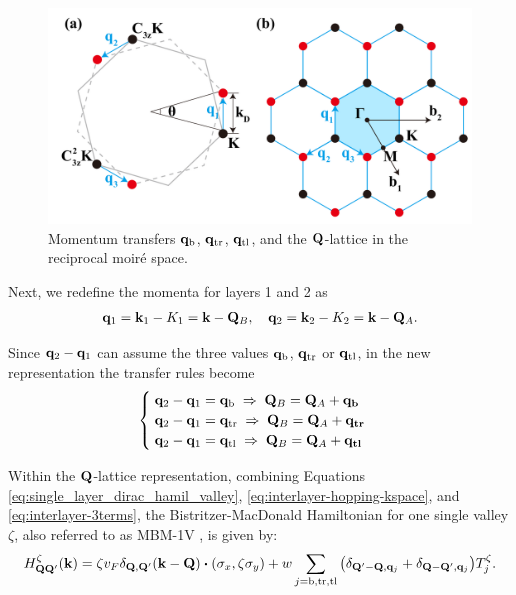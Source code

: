 \begin{figure}[H]
\centering
\includegraphics[width=0.8\linewidth]{fig/moire-vectors.png}
\caption{Momentum transfers \( {\vb{q}}_{\text{b}} \), \( {\vb{q}}_{\text{tr}} \), \( {\vb{q}}_{\text{tl}} \), and the \( {\vb{Q}} \)-lattice in the reciprocal moiré space.}
\label{fig:Q_lattice}
\end{figure}

Next, we redefine the momenta for layers 1 and 2 as
\begin{equation} \label{eq:redef_k1k2_momenta_Qlattice}
{\vb{q}}_1 = {\vb{k}}_1 - K_1 = {\vb{k}} - {\vb{Q}}_B, \quad {\vb{q}}_2 = {\vb{k}}_2 - K_2 = {\vb{k}} - {\vb{Q}}_A.
\end{equation}

Since ${\vb{q}}_2 - {\vb{q}}_1$ can assume the three values ${\vb{q}}_{\text{b}}$, ${\vb{q}}_{\text{tr}}$ or ${\vb{q}}_{\text{tl}}$, in the new representation the transfer rules become
\begin{align} \label{eq:selection_rules_qbqtrqtl_QAQB}
\begin{cases}
\; {\vb{q}}_2-{\vb{q}}_1={\vb{q}}_{\text{b}}  \; \Rightarrow \; {\vb{Q}}_B = {\vb{Q}}_A + {\vb{q}}_{\textbf{b}} \\
\; {\vb{q}}_2-{\vb{q}}_1={\vb{q}}_{\text{tr}} \; \Rightarrow \; {\vb{Q}}_B = {\vb{Q}}_A + {\vb{q}}_{\textbf{tr}} \\
\; {\vb{q}}_2-{\vb{q}}_1={\vb{q}}_{\text{tl}} \; \Rightarrow \; {\vb{Q}}_B = {\vb{Q}}_A + {\vb{q}}_{\textbf{tl}}
\end{cases}
\end{align}

Within the ${\vb{Q}}$-lattice representation, combining Equations \ref{eq:single_layer_dirac_hamil_valley}, \ref{eq:interlayer-hopping-kspace}, and \ref{eq:interlayer-3terms}, the Bistritzer-MacDonald Hamiltonian for one single valley \( \zeta \), also referred to as MBM-1V \cite{all_magic_angles}, is given by:
\begin{equation} \label{eq:mbm-1v}
H^\zeta_{\Q\Q'}(\k) = \zeta v_F \delta_{\Q,\Q'} (\k - \Q) \vdot (\s_x, \zeta \s_y) +
w \sum_{j = \text{b},\text{tr},\text{tl}} \qty(\delta_{\Q'-\Q,\q_j} + \delta_{\Q-\Q',\q_j}) T_{j}^\zeta.
\end{equation}

